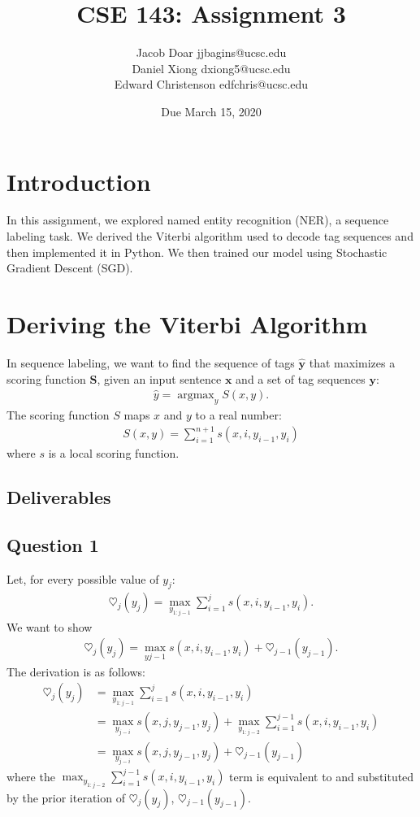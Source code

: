 \documentclass[12pt,notitlepage]{article}
\title{CSE 143: Assignment 3}
\author{Jacob Doar jjbagins@ucsc.edu\\
	Daniel Xiong dxiong5@ucsc.edu\\
	Edward Christenson edfchris@ucsc.edu}
\date{Due March 15, 2020}
\DeclareMathOperator*{\argmax}{argmax}
\begin{document}
\maketitle

\section{Introduction}
In this assignment, we explored named entity recognition (NER), a sequence labeling task. We derived the Viterbi algorithm used to decode tag sequences and then implemented it in Python. We then trained our model using Stochastic Gradient Descent (SGD).

\section{Deriving the Viterbi Algorithm}
In sequence labeling, we want to find the sequence of tags $\boldsymbol{\hat{y}}$ that maximizes a scoring function $\boldsymbol{S}$, given an input sentence $\boldsymbol{x}$ and a set of tag sequences $\boldsymbol{y}$:
\begin{align}
	\hat{y} = \argmax_y S(x,y).
\end{align}
The scoring function $S$ maps $x$ and $y$ to a real number:
\begin{align}
	S(x,y) = \sum_{i=1}^{n+1} s(x,i,y_{i-1},y_i)
\end{align}
where $s$ is a local scoring function. 
\subsection{Deliverables}
\subsection*{Question 1}
Let, for every possible value of $y_j$:
\begin{align}
	\heartsuit_j(y_j) = \max_{y_{1:j-1}} \sum_{i=1}^{j} s(x,i,y_{i-1},y_i).
\end{align}
We want to show
\begin{align}
\heartsuit_j(y_j) = \max_{y{j-1}} s(x,i,y_{i-1},y_i) + \heartsuit_{j-1}(y_{j-1}).
\end{align}
The derivation is as follows: 
\begin{align*}
	\heartsuit_j(y_j) &= \max_{y_{1:j-1}} \sum_{i=1}^{j} s(x,i,y_{i-1},y_i) \\
	&= \max_{y_{j-i}} s(x,j,y_{j-1},y_j) + \max_{y_{1:j-2}} \sum_{i=1}^{j-1} s(x,i,y_{i-1},y_i)\\
	&= \max_{y_{j-i}} s(x,j,y_{j-1},y_j) + \heartsuit_{j-1}(y_{j-1})
\end{align*}
where the $\max_{y_{1:j-2}} \sum_{i=1}^{j-1} s(x,i,y_{i-1},y_i)$ term is equivalent to and substituted by the prior iteration of $\heartsuit_j(y_j)$, $\heartsuit_{j-1}(y_{j-1})$.
\end{document}
